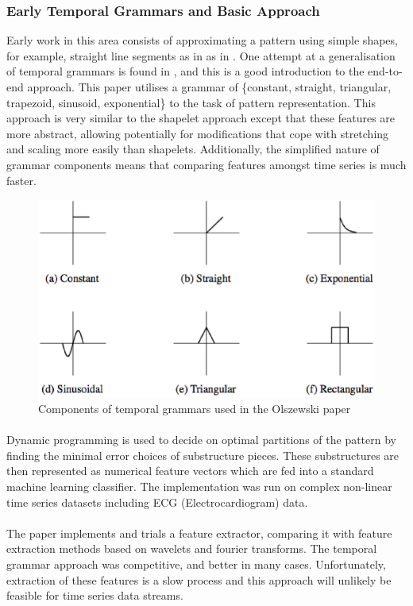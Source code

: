 	\subsubsection{Early Temporal Grammars and Basic Approach}
	Early work in this area consists of approximating a pattern using simple shapes, for example, straight line segments as in as in \citep{keogh1998enhanced}. One attempt at a generalisation of temporal grammars is found in \citep{olszewski2001generalized}, and this is a good introduction to the end-to-end approach. This paper utilises a grammar of \{constant, straight, triangular, trapezoid, sinusoid, exponential\} to the task of pattern representation. This approach is very similar to the shapelet approach except that these features are more abstract, allowing potentially for modifications that cope with stretching and scaling more easily than shapelets. Additionally, the simplified nature of grammar components means that comparing features amongst time series is much faster. 
	\begin{figure}[ht!]
	\centering
	\includegraphics[width=120mm]{images/ozlewskigrammar.eps}
	\caption{Components of temporal grammars used in the Olszewski paper}
	\label{oslewskigrammar}
	\end{figure}
	
	\paragraph{}
	Dynamic programming is used to decide on optimal partitions of the pattern by finding the minimal error choices of substructure pieces. These substructures are then represented as numerical feature vectors which are fed into a standard machine learning classifier. The implementation was run on complex non-linear time series datasets including ECG (Electrocardiogram) data. 
	\paragraph{}
	The paper implements and trials a feature extractor, comparing it with feature extraction methods based on wavelets and fourier transforms. The temporal grammar approach was competitive, and better in many cases. Unfortunately, extraction of these features is a slow process and this approach will unlikely be feasible for time series data streams.
	
